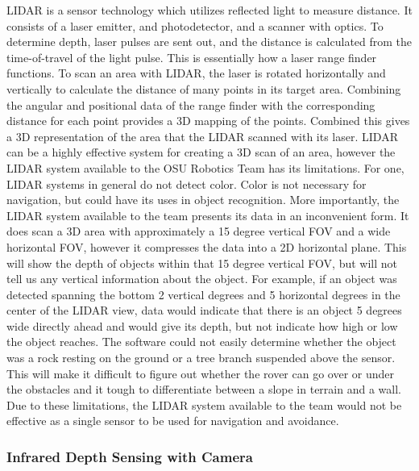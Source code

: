 \documentclass[10pt, oneside,onecolumn]{IEEEtran}
\begin{document}
\begin{titlepage}
LIDAR is a sensor technology which utilizes reflected light to measure distance. It consists of a laser emitter, and photodetector, and a scanner with optics. To determine depth, laser pulses are sent out, and the distance is calculated from the time-of-travel of the light pulse. This is essentially how a laser range finder functions. To scan an area with LIDAR, the laser is rotated horizontally and vertically to calculate the distance of many points in its target area. Combining the angular and positional data of the range finder with the corresponding distance for each point provides a 3D mapping of the points. Combined this gives a 3D representation of the area that the LIDAR scanned with its laser. 
LIDAR can be a highly effective system for creating a 3D scan of an area, however the LIDAR system available to the OSU Robotics Team has its limitations. For one, LIDAR systems in general do not detect color. Color is not necessary for navigation, but could have its uses in object recognition. More importantly, the LIDAR system available to the team presents its data in an inconvenient form. It does scan a 3D area with approximately a 15 degree vertical FOV and a wide horizontal FOV, however it compresses the data into a 2D horizontal plane. This will show the depth of objects within that 15 degree vertical FOV, but will not tell us any vertical information about the object. For example, if an object was detected spanning the bottom 2 vertical degrees and 5 horizontal degrees in the center of the LIDAR view, data would indicate that there is an object 5 degrees wide directly ahead and would give its depth, but not indicate how high or low the object reaches. The software could not easily determine whether the object was a rock resting on the ground or a tree branch suspended above the sensor. This will make it difficult to figure out whether the rover can go over or under the obstacles and it tough to differentiate between a slope in terrain and a wall. Due to these limitations, the LIDAR system available to the team would not be effective as a single sensor to be used for navigation and avoidance. 

\subsubsection{Infrared Depth Sensing with Camera}


\end{titlepage}
\end{document}

